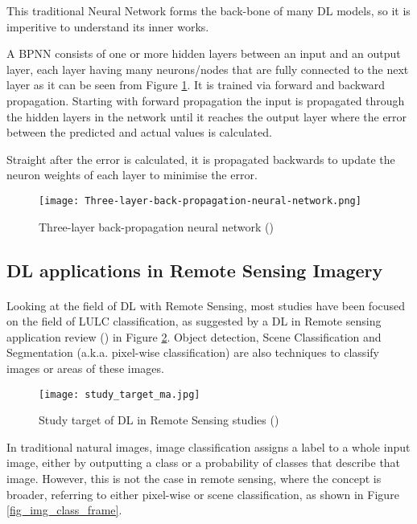 This traditional Neural Network forms the back-bone of many \gls{DL} models, so it is imperitive to understand its inner works.

A \gls{BPNN} consists of one or more hidden layers between an input and an output layer, each layer having many neurons/nodes that are fully connected to the next layer as it can be seen from Figure \ref{fig_bpnn}. It is trained via forward and backward propagation. Starting with forward propagation the input is propagated through the hidden layers in the network until it reaches the output layer where the error between the predicted and actual values is calculated. 

Straight after the error is calculated, it is propagated backwards to update the neuron weights of each layer to minimise the error.

    \begin{figure}[hbt!]
        \centering
        \texttt{[image: Three-layer-back-propagation-neural-network.png]}
        \caption{Three-layer back-propagation neural network (\cite{NNpic})}
        \label{fig_bpnn}
    \end{figure}

\subsection{\gls{DL} applications in Remote Sensing Imagery} \label{dl_rs}
\paragraph{}
Looking at the field of \gls{DL} with Remote Sensing, most studies have been focused on the field of \gls{LULC} classification, as suggested by a \gls{DL} in Remote sensing application review (\cite{MA2019166}) in Figure \ref{fig_dl_studies}. Object detection, Scene Classification and Segmentation (\gls{a.k.a.} pixel-wise classification) are also techniques to classify images or areas of these images.

    \begin{figure}[hbt!]
        \centering
        \texttt{[image: study\_target\_ma.jpg]}
        \caption{Study target of \gls{DL} in Remote Sensing studies (\cite{MA2019166})}
        \label{fig_dl_studies}
    \end{figure}

In traditional natural images, image classification assigns a label to a whole input image, either by outputting a class or a probability of classes that describe that image. However, this is not the case in remote sensing, where the concept is broader, referring to either pixel-wise or scene classification, as shown in Figure \ref{fig_img_class_frame}.

